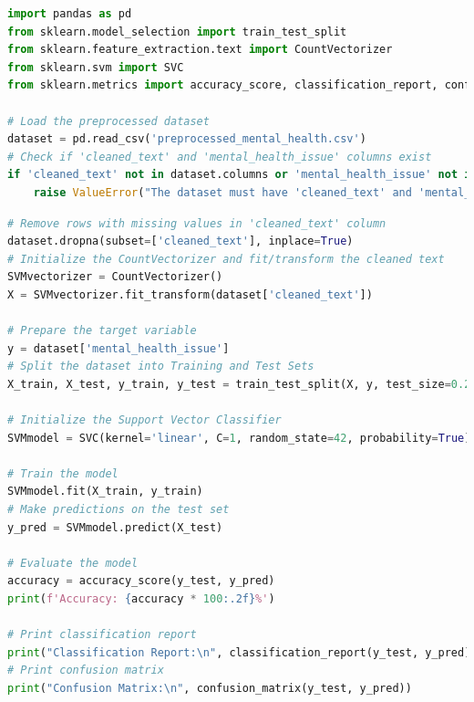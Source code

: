 \begin{tcolorbox}[colback=gray!5!white, colframe=gray!80!black, boxrule=0.5pt, title=Support Vector Classifier Implementation]
    \begin{lstlisting}[language=Python]
import pandas as pd
from sklearn.model_selection import train_test_split
from sklearn.feature_extraction.text import CountVectorizer
from sklearn.svm import SVC
from sklearn.metrics import accuracy_score, classification_report, confusion_matrix

# Load the preprocessed dataset
dataset = pd.read_csv('preprocessed_mental_health.csv')
# Check if 'cleaned_text' and 'mental_health_issue' columns exist
if 'cleaned_text' not in dataset.columns or 'mental_health_issue' not in dataset.columns:
    raise ValueError("The dataset must have 'cleaned_text' and 'mental_health_issue' columns.")
\end{lstlisting}
\end{tcolorbox}
\begin{tcolorbox}[colback=gray!5!white, colframe=gray!80!black, boxrule=0.5pt, title=Support Vector Classifier Implementation]
    \begin{lstlisting}[language=Python]
# Remove rows with missing values in 'cleaned_text' column
dataset.dropna(subset=['cleaned_text'], inplace=True)
# Initialize the CountVectorizer and fit/transform the cleaned text
SVMvectorizer = CountVectorizer()
X = SVMvectorizer.fit_transform(dataset['cleaned_text'])

# Prepare the target variable
y = dataset['mental_health_issue']
# Split the dataset into Training and Test Sets
X_train, X_test, y_train, y_test = train_test_split(X, y, test_size=0.2, random_state=42)

# Initialize the Support Vector Classifier
SVMmodel = SVC(kernel='linear', C=1, random_state=42, probability=True)  # You can adjust parameters as needed

# Train the model
SVMmodel.fit(X_train, y_train)
# Make predictions on the test set
y_pred = SVMmodel.predict(X_test)

# Evaluate the model
accuracy = accuracy_score(y_test, y_pred)
print(f'Accuracy: {accuracy * 100:.2f}%')

# Print classification report
print("Classification Report:\n", classification_report(y_test, y_pred))
# Print confusion matrix
print("Confusion Matrix:\n", confusion_matrix(y_test, y_pred))
\end{lstlisting}
\end{tcolorbox}

